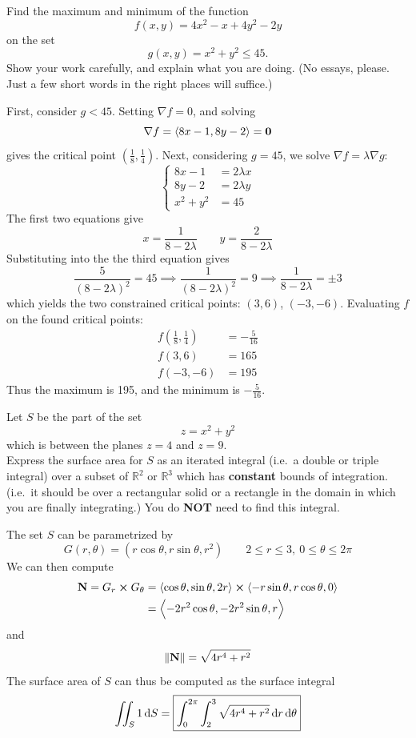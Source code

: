 \documentclass[12pt,answers]{exam}
\newcommand{\vect}[1]{\left\langle #1 \right\rangle}
\newcommand{\RR}{\mathbb{R}}
\begin{document}
\begin{questions}
	\newpage
	\question
	Find the maximum and minimum of the function
	\[
		f(x,y) = 4x^2 - x + 4y^2 - 2y
	\]
	on the set 
	\[
		g(x,y) = x^2 + y^2 \le 45.
	\]
	Show your work carefully, and explain what you are doing. (No essays, please. Just a few short words in the right places will suffice.)
	\begin{solution}
		First, consider $g < 45$. Setting $\nabla f = 0$, and solving
		\[
			\nabla f = \vect{8x-1, 8y-2} = \vb 0
		\]
		gives the critical point $(\frac18, \frac14)$.
		Next, considering $g = 45$, we solve $\nabla f = \lambda \nabla g$:
		\[
			\left\{
				\begin{aligned}
					8x-1 &= 2\lambda x \\ 
					8y-2 &= 2\lambda y\\
					x^2 + y^2 &= 45
				\end{aligned}
			\right.
		\]
		The first two equations give
		\[
			x = \frac{1}{8-2\lambda}\qquad y = \frac{2}{8-2\lambda}
		\]
		Substituting into the the third equation gives
		\[
			\frac{5}{(8-2\lambda)^2} = 45 \implies \frac{1}{(8-2\lambda)^2} = 9 \implies \frac{1}{8-2\lambda} = \pm 3
		\]
		which yields the two constrained critical points: $(3, 6)$, $(-3, -6)$.
		Evaluating $f$ on the found critical points:
		\begin{align*}
			f(\frac18, \frac14) &= -\frac{5}{16} \\ 
			f(3, 6) &= 165 \\ 
			f(-3, -6) &= 195
		\end{align*}
		Thus the maximum is 195, and the minimum is $-\frac{5}{16}$.
	\end{solution}

	\newpage
	\question
	Let $S$ be the part of the set 
	\[
		z = x^2 + y^2
	\]
	which is between the planes $z=4$ and $z=9$. \\ 
	Express the surface area for $S$ as an iterated integral (i.e.~a double or triple integral) over a subset of $\RR^2$ or $\RR^3$ which has \textbf{constant} bounds of integration. (i.e.~it should be over a rectangular solid or a rectangle in the domain in which you are finally integrating.) You do \textbf{NOT} need to find this integral.
	\begin{solution}
		The set $S$ can be parametrized by 
		\[
			G(r, \theta) = (r\cos \theta, r\sin\theta, r^2) \qquad 2 \le r \le 3, \ 0 \le \theta \le 2\pi
		\]
		We can then compute
		\begin{align*}
			\vb{N} = G_r \cross G_\theta 
			&= \vect{\cos \theta, \sin\theta, 2r} \cross \vect{-r\sin\theta, r\cos\theta, 0}  \\ 
			&= \vect{-2r^2\cos\theta, -2r^2\sin\theta, r}
		\end{align*}
		and
		\[
			\|\vb{N}\| = \sqrt{4r^4+r^2}
		\]
		The surface area of $S$ can thus be computed as the surface integral
		\[
			\iint_S 1 \dif S  = \boxed{\int_0^{2\pi} \int_2^3 \sqrt{4r^4+r^2} \dif r \dif \theta}
		\]
	\end{solution}


\end{questions}
\end{document}
